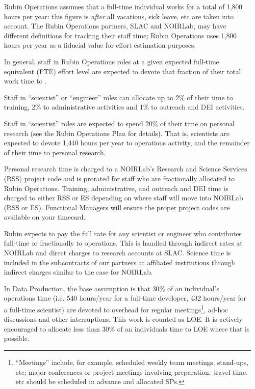 Rubin Operations assumes that a full-time individual works for a total of 1,800 hours per year: this figure is \emph{after} all vacations, sick leave, etc are taken into account.
The Rubin Operations partners, SLAC and NOIRLab, may have different definitions for tracking their staff time; Rubin Operations uses 1,800 hours per year as a fiducial value for effort estimation purposes.

In general, staff in Rubin Operations roles at a given expected full-time equivalent (FTE) effort level are expected to devote that fraction of their total work time to \RO.

Staff in ``scientist'' or ``engineer'' roles can allocate up to 2\% of their time to training, 2\% to administrative activities and 1\% to outreach and DEI activities.

Staff in ``scientist'' roles are expected to spend 20\% of their time on personal research (see the Rubin Operations Plan for details).
That is, scientists are expected to devote 1,440 hours per
year to operations activity, and the remainder of their time to personal research.

Personal research time is charged to a NOIRLab's Research and Science Services (RSS) project code and is prorated for staff who are fractionally allocated to Rubin Operations.
Training, administrative, and outreach and DEI time is charged to either RSS or ES depending on where staff will move into NOIRLab (RSS or ES).
Functional Managers will ensure the proper project codes are available on your timecard.

Rubin expects to pay the full rate for any scientist or engineer who contributes full-time or fractionally to operations.
This is handled through indirect rates at NOIRLab and direct charges to research accounts at SLAC.
Science time is included in the subcontracts of our partners at affiliated institutions through indirect charges
similar to the case for NOIRLab.

In Data Production, the base assumption is that 30\% of an individual's \RO operations time (i.e. 540 hours/year for a full-time developer, 432 hours/year for a full-time scientist) are devoted to
overhead for regular meetings\footnote{``Meetings'' include, for example, scheduled weekly team meetings, stand-ups, etc;
major conferences or project meetings involving preparation, travel time, etc should be scheduled in advance and allocated \glspl{SP}.},
ad-hoc discussions and other interruptions.
This work is counted as \gls{LOE}.
It is actively encouraged to allocate less than 30\% of an individuals time to \gls{LOE} where that is possible.

